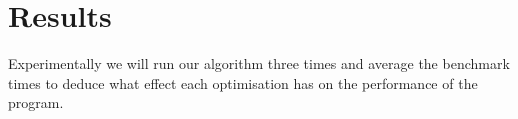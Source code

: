 \section{Results}
Experimentally we will run our algorithm three times and average the benchmark times to deduce what effect each optimisation has on the performance of the program.






